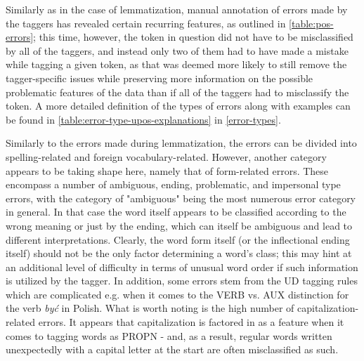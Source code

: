 Similarly as in the case of lemmatization, manual annotation of errors made by the taggers has revealed certain recurring features, as outlined in \autoref{table:pos-errors}; this time, however, the token in question did not have to be misclassified by all of the taggers, and instead only two of them had to have made a mistake while tagging a given token, as that was deemed more likely to still remove the tagger-specific issues while preserving more information on the possible problematic features of the data than if all of the taggers had to misclassify the token. A more detailed definition of the types of errors along with examples can be found in \autoref{table:error-type-upos-explanations} in \autoref{error-types}.

Similarly to the errors made during lemmatization, the errors can be divided into spelling-related and foreign vocabulary-related. However, another category appears to be taking shape here, namely that of form-related errors. These encompass a number of ambiguous, ending, problematic, and impersonal type errors, with the category of "ambiguous" being the most numerous error category in general. In that case the word itself appears to be classified according to the wrong meaning or just by the ending, which can itself be ambiguous and lead to different interpretations. Clearly, the word form itself (or the inflectional ending itself) should not be the only factor determining a word's class; this may hint at an additional level of difficulty in terms of unusual word order if such information is utilized by the tagger. In addition, some errors stem from the UD tagging rules which are complicated e.g. when it comes to the VERB vs. AUX distinction for the verb \textit{być} in Polish. What is worth noting is the high number of capitalization-related errors. It appears that capitalization is factored in as a feature when it comes to tagging words as PROPN - and, as a result, regular words written unexpectedly with a capital letter at the start are often misclassified as such. 

